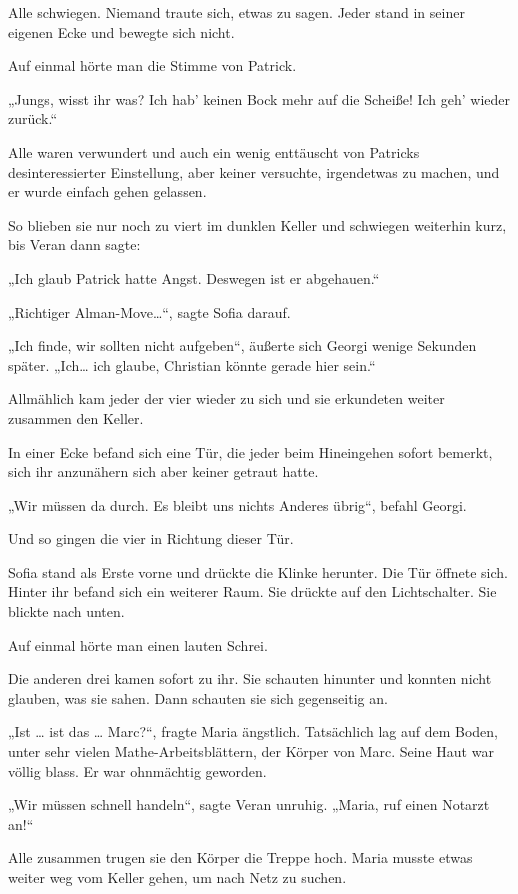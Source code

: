 \documentclass[oneside]{memoir}
\begin{document}
Alle schwiegen. Niemand traute sich, etwas zu sagen. Jeder stand in seiner eigenen Ecke und bewegte sich nicht.

Auf einmal hörte man die Stimme von Patrick.

„Jungs, wisst ihr was? Ich hab' keinen Bock mehr auf die Scheiße! 
Ich geh' wieder zurück.“

Alle waren verwundert und auch ein wenig enttäuscht von Patricks desinteressierter Einstellung, aber keiner versuchte, irgendetwas zu machen, und er wurde einfach gehen gelassen.

\bigskip
So blieben sie nur noch zu viert im dunklen Keller und schwiegen weiterhin kurz, bis Veran dann sagte:

„Ich glaub Patrick hatte Angst. Deswegen ist er abgehauen.“

„Richtiger Alman-Move\ldots“, sagte Sofia darauf.

„Ich finde, wir sollten nicht aufgeben“, äußerte sich Georgi wenige Sekunden später. „Ich\ldots{} ich glaube, Christian könnte gerade hier sein.“

Allmählich kam jeder der vier wieder zu sich und sie erkundeten weiter zusammen den Keller.

In einer Ecke befand sich eine Tür, die jeder beim Hineingehen sofort bemerkt, sich ihr anzunähern sich aber keiner getraut hatte.

„Wir müssen da durch. Es bleibt uns nichts Anderes übrig“, befahl Georgi.

Und so gingen die vier in Richtung dieser Tür.

Sofia stand als Erste vorne und drückte die Klinke herunter. Die Tür öffnete sich. Hinter ihr befand sich ein weiterer Raum. Sie drückte auf den Lichtschalter. Sie blickte nach unten.

Auf einmal hörte man einen lauten Schrei.

Die anderen drei kamen sofort zu ihr. Sie schauten hinunter und konnten nicht glauben, was sie sahen. Dann schauten sie sich gegenseitig an.

„Ist \ldots{} ist das \ldots{} Marc?“, fragte Maria ängstlich.
Tatsächlich lag auf dem Boden, unter sehr vielen Mathe-Arbeitsblättern, der Körper von Marc. Seine Haut war völlig blass. Er war ohnmächtig geworden.

„Wir müssen schnell handeln“, sagte Veran unruhig. „Maria, ruf einen Notarzt an!“

Alle zusammen trugen sie den Körper die Treppe hoch. Maria musste etwas weiter weg vom Keller gehen, um nach Netz zu suchen.
\end{document}

